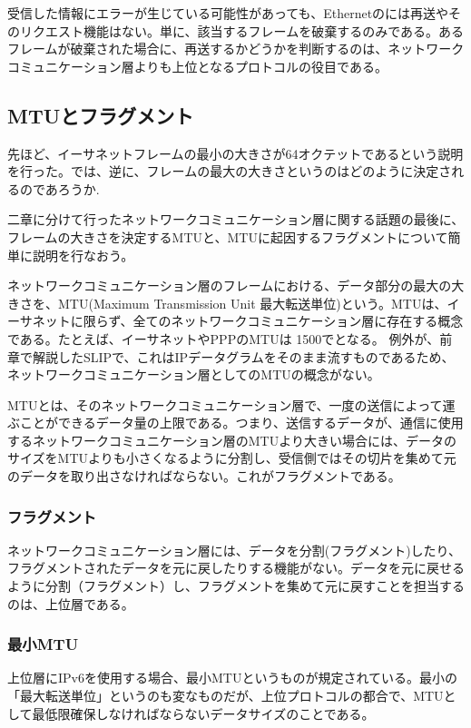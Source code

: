 受信した情報にエラーが生じている可能性があっても、Ethernetのには再送やそのリクエスト機能はない。単に、該当するフレームを破棄するのみである。あるフレームが破棄された場合に、再送するかどうかを判断するのは、ネットワークコミュニケーション層よりも上位となるプロトコルの役目である。

\subsection{MTUとフラグメント}

先ほど、イーサネットフレームの最小の大きさが64オクテットであるという説明を行った。では、逆に、フレームの最大の大きさというのはどのように決定されるのであろうか. 

二章に分けて行ったネットワークコミュニケーション層に関する話題の最後に、フレームの大きさを決定するMTUと、MTUに起因するフラグメントについて簡単に説明を行なおう。

ネットワークコミュニケーション層のフレームにおける、データ部分の最大の大きさを、MTU(Maximum Transmission Unit 最大転送単位)という。MTUは、イーサネットに限らず、全てのネットワークコミュニケーション層に存在する概念である。たとえば、イーサネットやPPPのMTUは 1500でとなる。
例外が、前章で解説したSLIPで、これはIPデータグラムをそのまま流すものであるため、ネットワークコミュニケーション層としてのMTUの概念がない。

MTUとは、そのネットワークコミュニケーション層で、一度の送信によって運ぶことができるデータ量の上限である。つまり、送信するデータが、通信に使用するネットワークコミュニケーション層のMTUより大きい場合には、データのサイズをMTUよりも小さくなるように分割し、受信側ではその切片を集めて元のデータを取り出さなければならない。これがフラグメントである。

\subsubsection{フラグメント}
ネットワークコミュニケーション層には、データを分割(フラグメント)したり、フラグメントされたデータを元に戻したりする機能がない。データを元に戻せるように分割（フラグメント）し、フラグメントを集めて元に戻すことを担当するのは、上位層である。



\subsubsection{最小MTU}
上位層にIPv6を使用する場合、最小MTUというものが規定されている。最小の「最大転送単位」というのも変なものだが、上位プロトコルの都合で、MTUとして最低限確保しなければならないデータサイズのことである。

